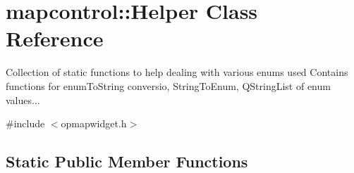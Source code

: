 \hypertarget{classmapcontrol_1_1_helper}{\section{mapcontrol\-:\-:\-Helper \-Class \-Reference}
\label{classmapcontrol_1_1_helper}
}


\-Collection of static functions to help dealing with various enums used \-Contains functions for enum\-To\-String conversio, \-String\-To\-Enum, \-Q\-String\-List of enum values...  




{\ttfamily \#include $<$opmapwidget.\-h$>$}

\subsection*{\-Static \-Public \-Member \-Functions}
